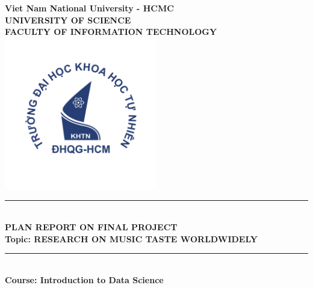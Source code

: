 \documentclass[13pt]{article}
\newcommand{\HRule}{\textcolor{myblue}{\rule{\linewidth}{0.5mm}}}
\begin{document}
\begin{titlepage}
    \centering

    
    {\textbf{\Huge Viet Nam National University - HCMC}}\\[0.6cm]
    {\textbf{\LARGE UNIVERSITY OF SCIENCE}}\\[0.4cm]
    {\textbf{\large FACULTY OF INFORMATION TECHNOLOGY}}\\[0.4cm]
    \includegraphics[width=0.5\textwidth]{img/Logo.png} \\
    
    \HRule \\[0.4cm]
    { 
    \LARGE{\bfseries PLAN REPORT ON FINAL PROJECT}\\[0.5cm]
    \large{\bfseries Topic: RESEARCH ON MUSIC TASTE WORLDWIDELY}
    }\\[0.4cm]
    \HRule \\[1cm]
    
    \textbf{\LARGE Course: Introduction to Data Science}\\[0.5cm]
    

\end{titlepage}
\end{document}
